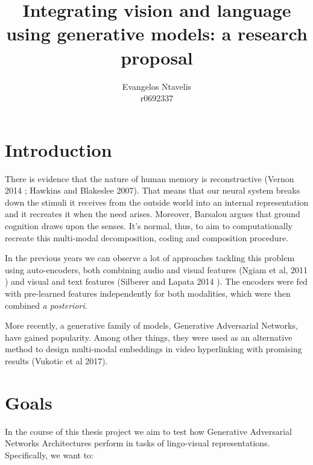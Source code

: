 \documentclass[12pt]{article}
\begin{document}


\title{Integrating vision and language using generative models: a research proposal}
\author{Evangelos Ntavelis\\ %
r0692337\\
} %

\maketitle

\section{Introduction}

There is evidence that the nature of human memory is reconstructive (Vernon 2014 \cite{ACS}; Hawkins and Blakeslee 2007\cite{onInt}). That means that our neural system breaks down the stimuli it receives from the outside world into an internal representation and it recreates it when the need arises. Moreover, Barsalou\cite{doi:10.1146/annurev.psych.59.103006.093639} argues that ground cognition draws upon the senses. It's normal, thus, to aim to computationally recreate this multi-modal decomposition, coding and composition procedure.

In the previous years we can observe a lot of approaches tackling this problem using auto-encoders, both combining audio and visual features (Ngiam et al, 2011 \cite{conf/icml/NgiamKKNLN11}) and visual and text features (Silberer and Lapata 2014 \cite{silberer2014learning}). The encoders were fed with pre-learned features independently for both modalities, which were then combined \textit{a posteriori}. 

More recently, a generative family of models, Generative Adversarial Networks, have gained popularity. Among other things, they were used as an alternative method to design multi-modal embeddings in video hyperlinking with promising results (Vukotic et al 2017).

\section{Goals}

In the course of this thesis project we aim to test how Generative Adversarial Networks Architectures perform in tasks of lingo-visual representations. Specifically, we want to:
\end{document}
